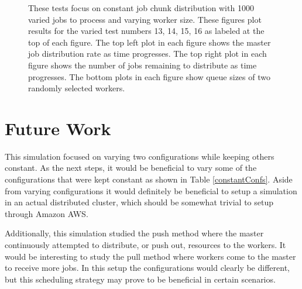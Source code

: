 \documentclass{article}
\begin{document}
\begin{figure}[p]
  
  \caption{These tests focus on constant job chunk distribution with 1000 varied jobs to process and varying worker size. These figures plot results for the varied test numbers 13, 14, 15, 16 as labeled at the top of each figure. The top left plot in each figure shows the master job distribution rate as time progresses. The top right plot in each figure shows the number of jobs remaining to distribute as time progresses. The bottom plots in each figure show queue sizes of two randomly selected workers.}
  \label{testsVariedConstant} 
  
\end{figure}

\clearpage
\section{Future Work} \label{futureWork}
This simulation focused on varying two configurations while keeping others constant. As the next steps, it would be beneficial to vary some of the configurations that were kept constant as shown in Table \ref{constantConfs}. Aside from varying configurations it would definitely be beneficial to setup a simulation in an actual distributed cluster, which should be somewhat trivial to setup through Amazon AWS. 

Additionally, this simulation studied the push method where the master continuously attempted to distribute, or push out, resources to the workers. It would be interesting to study the pull method where workers come to the master to receive more jobs. In this setup the configurations would clearly be different, but this scheduling strategy may prove to be beneficial in certain scenarios.
\end{document}
